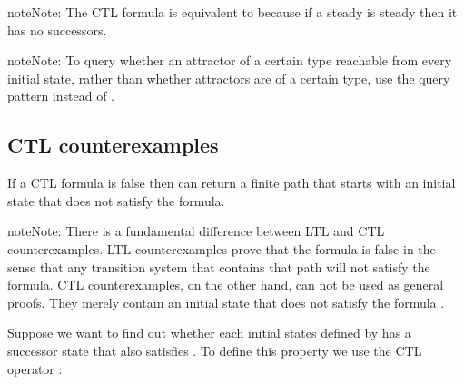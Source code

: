 \documentclass[letterpaper,10pt,english]{sphinxmanual}
\begin{document}
\begin{sphinxadmonition}{note}{Note:}
The CTL formula  is equivalent to  because if a steady is steady then it has no successors.
\end{sphinxadmonition}

\begin{sphinxadmonition}{note}{Note:}
To query whether  an attractor of a certain type reachable from every initial state,
rather than whether  attractors are of a certain type, use the query pattern  instead of .
\end{sphinxadmonition}


\subsection{CTL counterexamples}
\label{\detokenize{Manual:ctl-counterexamples}}
If a CTL formula is false then {\hyperref[\detokenize{Installation:installation-nusmv}]{}} can return a finite path that starts with an initial state that does not satisfy the formula.

\begin{sphinxadmonition}{note}{Note:}
There is a fundamental difference between LTL and CTL counterexamples.
LTL counterexamples prove that the formula is false in the sense that any transition system that contains that path will not satisfy the formula.
CTL counterexamples, on the other hand, can not be used as general proofs.
They merely contain an initial state that does not satisfy the formula .
\end{sphinxadmonition}

Suppose we want to find out whether each initial states defined by  has a successor state that also satisfies .
To define this property we use the CTL operator :
\end{document}
